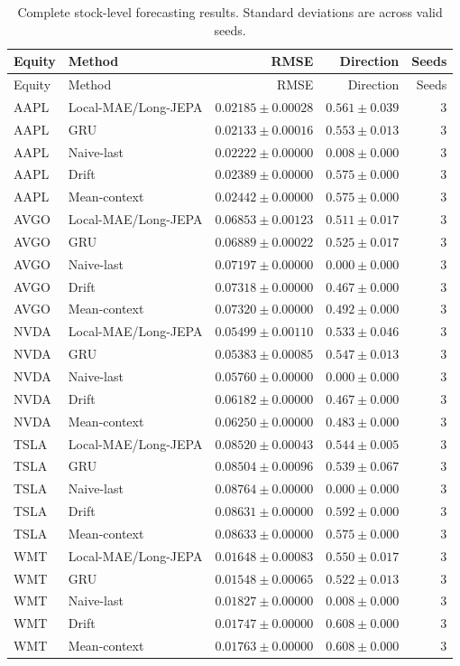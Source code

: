 \begin{longtable}{llrrr}
\caption{Complete stock-level forecasting results. Standard deviations are across valid seeds.}\label{tab:appendix_stock_metrics}\\
\toprule
Equity & Method & RMSE & Direction & Seeds \\
\midrule
\endfirsthead
\toprule
Equity & Method & RMSE & Direction & Seeds \\
\midrule
\endhead
AAPL & Local-MAE/Long-JEPA & $0.02185 \pm 0.00028$ & $0.561 \pm 0.039$ & 3 \\
AAPL & GRU & $0.02133 \pm 0.00016$ & $0.553 \pm 0.013$ & 3 \\
AAPL & Naive-last & $0.02222 \pm 0.00000$ & $0.008 \pm 0.000$ & 3 \\
AAPL & Drift & $0.02389 \pm 0.00000$ & $0.575 \pm 0.000$ & 3 \\
AAPL & Mean-context & $0.02442 \pm 0.00000$ & $0.575 \pm 0.000$ & 3 \\
AVGO & Local-MAE/Long-JEPA & $0.06853 \pm 0.00123$ & $0.511 \pm 0.017$ & 3 \\
AVGO & GRU & $0.06889 \pm 0.00022$ & $0.525 \pm 0.017$ & 3 \\
AVGO & Naive-last & $0.07197 \pm 0.00000$ & $0.000 \pm 0.000$ & 3 \\
AVGO & Drift & $0.07318 \pm 0.00000$ & $0.467 \pm 0.000$ & 3 \\
AVGO & Mean-context & $0.07320 \pm 0.00000$ & $0.492 \pm 0.000$ & 3 \\
NVDA & Local-MAE/Long-JEPA & $0.05499 \pm 0.00110$ & $0.533 \pm 0.046$ & 3 \\
NVDA & GRU & $0.05383 \pm 0.00085$ & $0.547 \pm 0.013$ & 3 \\
NVDA & Naive-last & $0.05760 \pm 0.00000$ & $0.000 \pm 0.000$ & 3 \\
NVDA & Drift & $0.06182 \pm 0.00000$ & $0.467 \pm 0.000$ & 3 \\
NVDA & Mean-context & $0.06250 \pm 0.00000$ & $0.483 \pm 0.000$ & 3 \\
TSLA & Local-MAE/Long-JEPA & $0.08520 \pm 0.00043$ & $0.544 \pm 0.005$ & 3 \\
TSLA & GRU & $0.08504 \pm 0.00096$ & $0.539 \pm 0.067$ & 3 \\
TSLA & Naive-last & $0.08764 \pm 0.00000$ & $0.000 \pm 0.000$ & 3 \\
TSLA & Drift & $0.08631 \pm 0.00000$ & $0.592 \pm 0.000$ & 3 \\
TSLA & Mean-context & $0.08633 \pm 0.00000$ & $0.575 \pm 0.000$ & 3 \\
WMT & Local-MAE/Long-JEPA & $0.01648 \pm 0.00083$ & $0.550 \pm 0.017$ & 3 \\
WMT & GRU & $0.01548 \pm 0.00065$ & $0.522 \pm 0.013$ & 3 \\
WMT & Naive-last & $0.01827 \pm 0.00000$ & $0.008 \pm 0.000$ & 3 \\
WMT & Drift & $0.01747 \pm 0.00000$ & $0.608 \pm 0.000$ & 3 \\
WMT & Mean-context & $0.01763 \pm 0.00000$ & $0.608 \pm 0.000$ & 3 \\
\bottomrule
\end{longtable}
